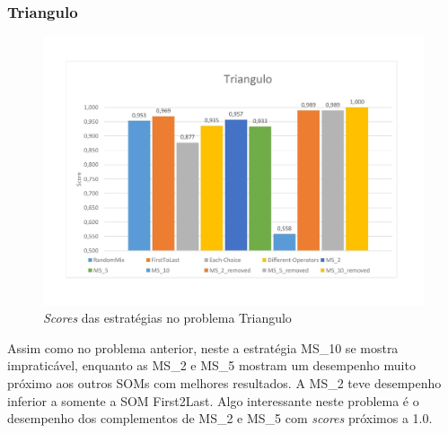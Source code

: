 \subsubsection{Triangulo}
\begin{figure}[H]
\includegraphics[width=1\textwidth]{graficos/problems/triangulo.jpg}
\caption{\textit{Scores} das estratégias no problema Triangulo}
\label{fig:triangulo}
\end{figure}
Assim como no problema anterior, neste a estratégia MS\_10 se mostra impraticável, enquanto as MS\_2 e MS\_5 mostram um desempenho muito próximo aos outros SOMs com melhores resultados. A MS\_2 teve desempenho inferior a somente a SOM First2Last. Algo interessante neste problema é o desempenho dos complementos de MS\_2 e MS\_5 com \textit{scores} próximos a 1.0.

